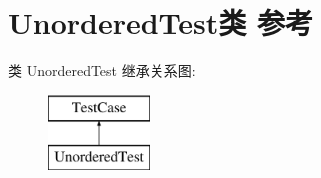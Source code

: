 \hypertarget{class_unordered_test}{}\section{Unordered\+Test类 参考}
\label{class_unordered_test}
类 Unordered\+Test 继承关系图\+:\begin{figure}[H]
\begin{center}
\leavevmode
\includegraphics[height=2.000000cm]{class_unordered_test}
\end{center}
\end{figure}
